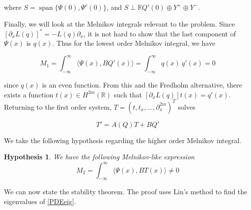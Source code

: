 \documentclass[12pt]{article}
\def\R{{\mathbb R}}
\DeclareMathOperator{\spn}{span}
\newtheorem{hypothesis}{Hypothesis}
\begin{document}
where $S = \spn\{ \Psi(0), \Psi^c(0) \}$, and $S \perp \R Q'(0) \oplus Y^+ \oplus Y^-$.

Finally, we will look at the Melnikov integrals relevant to the problem. Since $[ \partial_x L(q) ]^* = -L(q) \partial_x$, it is not hard to show that the last component of $\Psi(x)$ is $q(x)$. Thus for the lowest order Melnikov integral, we have

\begin{equation}
M_1 = \int_{-\infty}^\infty \langle \Psi(x), B Q'(x) \rangle =
\int_{-\infty}^\infty q(x) \: q'(x) = 0
\end{equation}

since $q(x)$ is an even function. From this and the Fredholm alternative, there exists a function $t(x) \in H^{2m}(\R)$ such that $[ \partial_x L(q) ]t(x) = q'(x)$. Returning to the first order system, $T = (t, t_x, \dots, \partial_x^{2m})^T$ solves 

\begin{equation}\label{eqforT}
T' = A(Q)T + BQ'
\end{equation}

We take the following hypothesis regarding the higher order Melnikov integral.

\begin{hypothesis}\label{Melnikov2}
We have the following Melnikov-like expression
\begin{equation}
M_2 = \int_{-\infty}^\infty \langle \Psi(x), B T(x) \rangle \neq 0
\end{equation}

\end{hypothesis}

We can now state the stability theorem. The proof uses Lin's method to find the eigenvalues of \eqref{PDEeig}.

\end{document}
